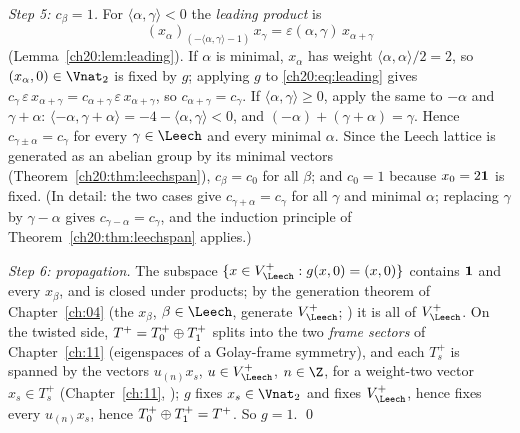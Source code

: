 \emph{Step 5: $c_\beta=1$.}  For $\langle\alpha,\gamma\rangle<0$ the \emph{leading product} is
\begin{equation}\label{ch20:eq:leading}
  (x_\alpha)_{(-\langle\alpha,\gamma\rangle-1)}\,x_\gamma=\varepsilon(\alpha,\gamma)\,x_{\alpha+\gamma}
\end{equation}
(Lemma~\ref{ch20:lem:leading}).  If $\alpha$ is minimal, $x_\alpha$ has weight $\langle\alpha,\alpha\rangle/2=2$, so
$(x_\alpha,0)\in\Vnat_2$ is fixed by $g$; applying $g$ to \eqref{ch20:eq:leading} gives
$c_\gamma\,\varepsilon\,x_{\alpha+\gamma}=c_{\alpha+\gamma}\,\varepsilon\,x_{\alpha+\gamma}$, so $c_{\alpha+\gamma}=c_\gamma$.  If
$\langle\alpha,\gamma\rangle\ge0$, apply the same to $-\alpha$ and $\gamma+\alpha$:
$\langle-\alpha,\gamma+\alpha\rangle=-4-\langle\alpha,\gamma\rangle<0$, and $(-\alpha)+(\gamma+\alpha)=\gamma$.  Hence
$c_{\gamma\pm\alpha}=c_\gamma$ for every $\gamma\in\Leech$ and every minimal $\alpha$.  Since the Leech lattice is
generated as an abelian group by its minimal vectors (Theorem~\ref{ch20:thm:leechspan}), $c_\beta=c_0$ for all $\beta$;
and $c_0=1$ because $x_0=2\mathbf 1$ is fixed.  (In detail: the two cases give $c_{\gamma+\alpha}=c_\gamma$ for all
$\gamma$ and minimal $\alpha$; replacing $\gamma$ by $\gamma-\alpha$ gives $c_{\gamma-\alpha}=c_\gamma$, and the induction principle of
Theorem~\ref{ch20:thm:leechspan} applies.)

\emph{Step 6: propagation.}  The subspace $\{x\in\chtwentyVL: g(x,0)=(x,0)\}$ contains $\mathbf 1$ and every
$x_\beta$, and is closed under products; by the generation theorem of Chapter~\ref{ch:04} (the $x_\beta$, $\beta\in\Leech$,
generate $\chtwentyVL$; ) it is all of $\chtwentyVL$.  On the twisted side, $T^{+}=T^+_0\oplus T^+_1$ splits into the two
\emph{frame sectors} of Chapter~\ref{ch:11} (eigenspaces of a Golay-frame symmetry), and each $T^+_s$ is spanned by the vectors $u_{(n)}x_s$, $u\in\chtwentyVL$, $n\in\Z$, for a weight-two
vector $x_s\in T^+_s$ (Chapter~\ref{ch:11}, ); $g$ fixes $x_s\in\Vnat_2$ and fixes $\chtwentyVL$,
hence fixes every $u_{(n)}x_s$, hence $T^+_0\oplus T^+_1=T^{+}$.  So $g=1$. \qed

